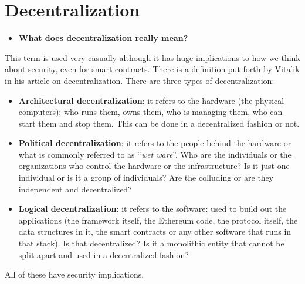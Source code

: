 \section{Decentralization}\label{decentralization}

\begin{itemize}
\tightlist
\item
  \textbf{What does decentralization really mean?}
\end{itemize}

This term is used very casually although it has huge implications to how
we think about security, even for smart contracts. There is a definition
put forth by Vitalik in his article on decentralization. There are three
types of decentralization:

\begin{itemize}
\item
  \textbf{Architectural decentralization}: it refers to the hardware
  (the physical computers); who runs them, owns them, who is managing
  them, who can start them and stop them. This can be done in a
  decentralized fashion or not.
\item
  \textbf{Political decentralization}: it refers to the people behind
  the hardware or what is commonly referred to as ``\emph{wet ware}''.
  Who are the individuals or the organizations who control the hardware
  or the infrastructure? Is it just one individual or is it a group of
  individuals? Are the colluding or are they independent and
  decentralized?
\item
  \textbf{Logical decentralization}: it refers to the software: used to
  build out the applications (the framework itself, the Ethereum code,
  the protocol itself, the data structures in it, the smart contracts or
  any other software that runs in that stack). Is that decentralized? Is
  it a monolithic entity that cannot be split apart and used in a
  decentralized fashion?
\end{itemize}

All of these have security implications.
